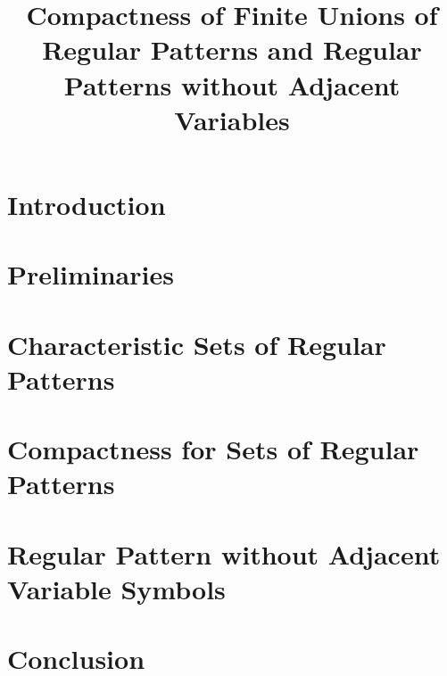 \documentclass[paper]{ieice}
\title{Compactness of Finite Unions of Regular Patterns and Regular Patterns without Adjacent Variables}
\begin{document}
\maketitle




\section{Introduction}\label{Sec:Intro}


\section{Preliminaries}\label{Sec:Prelim}




\section{Characteristic Sets of Regular Patterns}\label{Sec:CharacteristicSet}




\section{Compactness for Sets of Regular Patterns}\label{Sec:Compactness}



\section{Regular Pattern without Adjacent Variable Symbols}\label{Sec:RPAVS}


\section{Conclusion}







\end{document}
